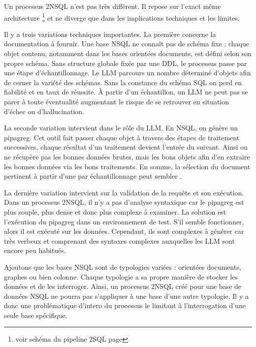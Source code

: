 \label{NoSQl} Un processus \gls{2NSQL} n'est pas très différent. Il repose sur l'exact même architecture \footnote{voir schéma du pipeline \gls{2SQL} page \pageref{fig:text-to-sql-schema}} et ne diverge que dans les implications techniques et les limites. 

Il y a trois variations techniques importantes. La première concerne la documentation à fournir. Une base \gls{NSQL} ne connaît pas de schéma fixe : chaque objet contenu, notamment dans les bases orientées documents, est défini selon son propre schéma. Sans structure globale fixée par une \gls{DDL}, le processus passe par une étape d'échantillonnage. Le \gls{LLM} parcours un nombre déterminé d'objets afin de cerner la variété des schémas. Sans la constance du schéma SQL on perd en fiabilité et en taux de réussite. À partir d'un échantillon, un \gls{LLM} ne peut pas se parer à toute éventualité augmentant le risque de se retrouver en situation d'échec ou d'hallucination.

La seconde variation intervient dans le rôle du \gls{LLM}. En \gls{NSQL}, on génère un \gls{pipagreg}. Cet outil fait passer chaque objet à travers des étapes de traitement successives, chaque résultat d'un traitement devient l'entrée du suivant. Ainsi on ne récupère pas les bonnes données brutes, mais les bons objets afin d'en extraire les bonnes données via les bons traitements. En somme, la sélection du document pertinent à partir d'une  par échantillonnage peut sembler .

La dernière variation intervient sur la validation de la requête et son exécution. Dans un processus \gls{2NSQL}, il n'y a pas d'analyse syntaxique car le \gls{pipagreg} est plus souple, plus dense et donc plus complexe à examiner. La solution est l'exécution du \gls{pipagreg} dans un environnement de test. S'il semble fonctionner, alors il est exécuté sur les données. Cependant, ils sont complexes à générer car très verbeux et comprenant des syntaxes complexes auxquelles les \gls{LLM} sont encore peu habitués.

Ajoutons que les bases \gls{NSQL} sont de typologies variées : orientées documents, graphes ou bien colonne. Chaque typologie a sa propre manière de stocker les données et de les interroger. Ainsi, un processus \gls{2NSQL} créé pour une base de données \gls{NSQL} ne pourra pas s'appliquer à une base d'une autre typologie. Il y a donc une problématique d'\gls{intero} du processus le limitant à l'interrogation d'une seule base spécifique.\newline

